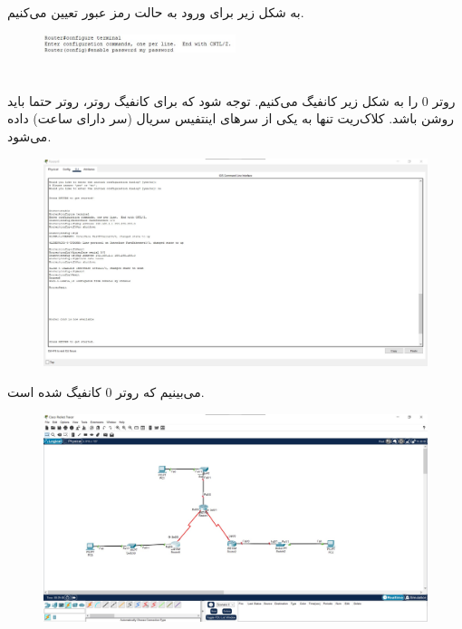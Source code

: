 \documentclass{article}
\begin{document}
\section{}%
به شکل زیر برای ورود به حالت  رمز عبور تعیین می‌کنیم.
\begin{figure}[H]
    \centering
    \includegraphics[width=0.5\textwidth]{figures/29.jpg}
    \caption{}
    \label{fig:fig1}
\end{figure}


\section{}%
روتر 0 را به شکل زیر کانفیگ می‌کنیم. توجه شود که برای کانفیگ روتر، روتر حتما باید روشن باشد. کلاک‌ریت تنها به یکی از سرهای اینتفیس سریال (سر دارای ساعت) داده می‌شود.
\begin{figure}[H]
    \centering
    \includegraphics[width=1.0\textwidth]{figures/5.jpg}
    \caption{}
    \label{fig:fig1}
\end{figure}
می‌بینیم که روتر 0 کانفیگ شده است.
\begin{figure}[H]
    \centering
    \includegraphics[width=1.0\textwidth]{figures/6.jpg}
    \caption{}
    \label{fig:fig1}
\end{figure}
\end{document}
